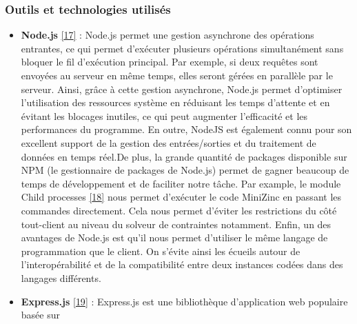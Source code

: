 \documentclass[12pt]{article}
\begin{document}
\iffalse
      \hypertarget{outils-et-technologies-utilisuxe9s-1}{%
            \subsubsection{Outils et technologies
                  utilisés}\label{outils-et-technologies-utilisuxe9s-1}}

      \begin{itemize}
            \item
                  \textbf{Node.js} \protect\hyperlink{ref-Node_js}{{[}17{]}} : Node.js
                  permet une gestion asynchrone des opérations entrantes, ce qui permet
                  d'exécuter plusieurs opérations simultanément sans bloquer le fil
                  d'exécution principal. Par exemple, si deux requêtes sont envoyées au
                  serveur en même temps, elles seront gérées en parallèle par le
                  serveur. Ainsi, grâce à cette gestion asynchrone, Node.js permet
                  d'optimiser l'utilisation des ressources système en réduisant les
                  temps d'attente et en évitant les blocages inutiles, ce qui peut
                  augmenter l'efficacité et les performances du programme. En outre,
                  NodeJS est également connu pour son excellent support de la gestion
                  des entrées/sorties et du traitement de données en temps
                  réel.\newline  De plus, la grande quantité de packages disponible sur
                  NPM (le gestionnaire de packages de Node.js) permet de gagner beaucoup
                  de temps de développement et de faciliter notre tâche. Par example, le
                  module Child processes
                  \protect\hyperlink{ref-Child_Processes}{{[}18{]}} nous permet
                  d'exécuter le code MiniZinc en passant les commandes directement. Cela
                  nous permet d'éviter les restrictions du côté tout-client au niveau du
                  solveur de contraintes notamment. Enfin, un des avantages de Node.js
                  est qu'il nous permet d'utiliser le même langage de programmation que
                  le client. On s'évite ainsi les écueils autour de l'interopérabilité
                  et de la compatibilité entre deux instances codées dans des langages
                  différents.
            \item
                  \textbf{Express.js} \protect\hyperlink{ref-Express_js}{{[}19{]}} :
                  Express.js est une bibliothèque d'application web populaire basée sur

\end{itemize}
\end{document}
